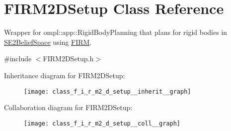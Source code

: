 \hypertarget{class_f_i_r_m2_d_setup}{\section{F\-I\-R\-M2\-D\-Setup Class Reference}
\label{class_f_i_r_m2_d_setup}
}


Wrapper for ompl\-::app\-::\-Rigid\-Body\-Planning that plans for rigid bodies in \hyperlink{class_s_e2_belief_space}{S\-E2\-Belief\-Space} using \hyperlink{class_f_i_r_m}{F\-I\-R\-M}.  




{\ttfamily \#include $<$F\-I\-R\-M2\-D\-Setup.\-h$>$}



Inheritance diagram for F\-I\-R\-M2\-D\-Setup\-:\nopagebreak
\begin{figure}[H]
\begin{center}
\leavevmode
\texttt{[image: class\_f\_i\_r\_m2\_d\_setup\_\_inherit\_\_graph]}
\end{center}
\end{figure}


Collaboration diagram for F\-I\-R\-M2\-D\-Setup\-:\nopagebreak
\begin{figure}[H]
\begin{center}
\leavevmode
\texttt{[image: class\_f\_i\_r\_m2\_d\_setup\_\_coll\_\_graph]}
\end{center}
\end{figure}
